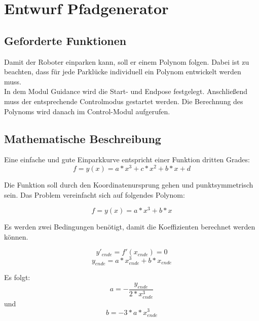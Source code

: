 \chapter{Entwurf Pfadgenerator}

\section{Geforderte Funktionen}

Damit der Roboter einparken kann, soll er einem Polynom folgen. Dabei ist zu beachten, dass für jede Parklücke individuell ein Polynom entwickelt werden muss.\\

\noindent In dem Modul Guidance wird die Start- und Endpose festgelegt. Anschließend muss der entsprechende Controlmodus gestartet werden. Die Berechnung des Polynoms wird danach im Control-Modul aufgerufen. 


\section{Mathematische Beschreibung}

Eine einfache und gute Einparkkurve entspricht einer Funktion dritten Grades:
\begin{equation}
f=y(x)=a*x^3+c*x^2+b*x+d
\end{equation}

\noindent Die Funktion soll durch den Koordinatenursprung gehen und punktsymmetrisch sein. Das Problem vereinfacht sich auf folgendes Polynom:

\begin{equation}
f=y(x)=a*x^3+b*x
\end{equation}

\noindent Es werden zwei Bedingungen benötigt, damit die Koeffizienten berechnet werden können. 

\begin{equation}
 y'_{ende}=f'(x_{ende})=0
 \end{equation}
 \begin{equation}
y_{ende}=a*x_{ende}^3+b*x_{ende}
 \end{equation}
 
\noindent Es folgt:
 \begin{equation}
a=-\dfrac{y_{ende}}{2*x_{ende}^3}
\end{equation}
\noindent und
\begin{equation} 
b=-3*a*x_{ende}^3
\end{equation}

